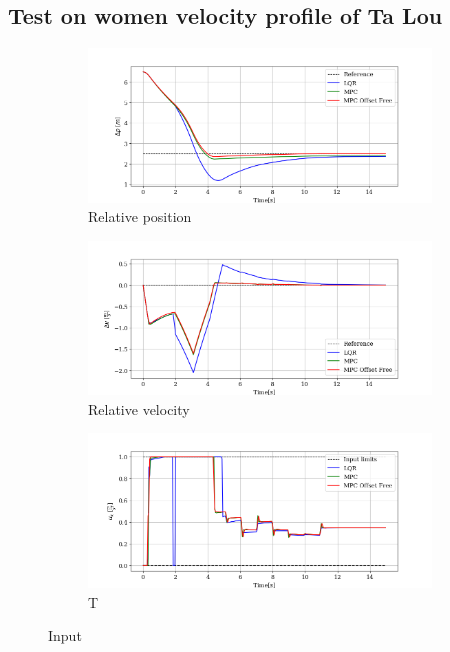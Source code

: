 \documentclass[a4paper,12pt,oneside]{book}
\begin{document}
\subsection{Test on women velocity profile of Ta Lou}
\begin{figure}[htbp]
    \centering
    \begin{subfigure}[t]{0.8\textwidth}
        \includegraphics[width=\textwidth]{Ta_Lou/Deltap.png}
        \caption{Relative position}
        \label{fig:Deltapwomen}
    \end{subfigure}
    
    \begin{subfigure}[t]{0.8\textwidth}
        \includegraphics[width=\textwidth]{Ta_Lou/Deltav.png}
        \caption{Relative velocity}
        \label{fig:Deltavwomen}
    \end{subfigure}
    
    \begin{subfigure}[t]{0.8\textwidth}
        \includegraphics[width=\textwidth]{Ta_Lou/Input.png}
        \caption{T}
        \label{fig:Inputwomen}
    \end{subfigure}
    \caption{Input}
    \label{fig:Women}
\end{figure}
\end{document}
